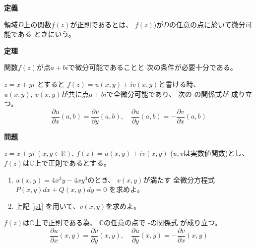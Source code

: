 \documentclass[12pt,b5paper]{ltjsarticle}
\begin{document}
\hrulefill
\textbf{定義}
\hrulefill

領域$D$上の関数$f(z)$が正則であるとは、
$f(z))$が$D$の任意の点に於いて微分可能である
ときにいう。


\textbf{定理}

関数$f(z)$が点$a+bi$で微分可能であることと
次の条件が必要十分である。

$z=x+yi$ とすると $f(z)=u(x,y)+iv(x,y)$と書ける時、
$u(x,y), \ v(x,y)$が共に点$a+bi$で全微分可能であり、
次の-の関係式が
成り立つ。
\begin{equation}
 \frac{\partial u}{\partial x}(a,b)
  =
 \frac{\partial v}{\partial y}(a,b),\quad
 \frac{\partial u}{\partial y}(a,b)
  = -
 \frac{\partial v}{\partial x}(a,b)
\end{equation}

\hrulefill
\textbf{問題}
\hrulefill

$z=x+yi \ (x,y\in\mathbb{R}),\ f(z)=u(x,y)+iv(x,y)$
($u,v$は実数値関数)とし、
$f(z)$は$\mathbb{C}$上で正則であるとする。
\begin{enumerate}
 \item\label{p1}
      $u(x,y)=4x^3y-4xy^3$のとき、
      $v(x,y)$が満たす
      全微分方程式$P(x,y)dx + Q(x,y)dy =0$
      を求めよ。

 \item
      上記 \ref{p1} を用いて、$v(x,y)$を求めよ。
\end{enumerate}

\dotfill

$f(z)$は$\mathbb{C}$上で正則である為、
$\mathbb{C}$の任意の点で
-の関係式
が成り立つ。
\begin{equation}
 \frac{\partial u}{\partial x}(x,y)
  =
 \frac{\partial v}{\partial y}(x,y),\quad
 \frac{\partial u}{\partial y}(x,y)
  = -
 \frac{\partial v}{\partial x}(x,y)
\end{equation}
\end{document}
